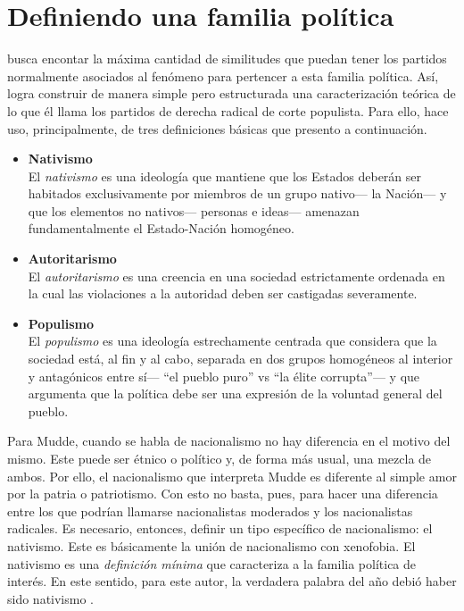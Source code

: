 \section{Definiendo una familia política}

\citeauthor{Mudde07a} busca encontar la máxima cantidad de similitudes que puedan tener los partidos normalmente asociados al fenómeno para pertencer a esta familia política. Así, logra construir de manera simple pero estructurada una caracterización teórica de lo que él llama los partidos de derecha radical de corte populista. Para ello, hace uso, principalmente, de tres definiciones básicas que presento a continuación.

\begin{itemize}
\item \textbf{Nativismo}\\
El \textit{nativismo} es una ideología que mantiene que los Estados deberán ser habitados exclusivamente por miembros de un grupo nativo--- la Nación--- y que los elementos no nativos--- personas e ideas--- amenazan fundamentalmente el Estado-Nación homogéneo.

\item \textbf{Autoritarismo}\\
El \textit{autoritarismo} es una creencia en una sociedad estrictamente ordenada en la cual las violaciones a la autoridad deben ser castigadas severamente.

\item \textbf{Populismo}\\
El \textit{populismo} es una ideología estrechamente centrada que considera que la sociedad está, al fin y al cabo, separada en dos grupos homogéneos al interior y antagónicos entre sí--- ``el pueblo puro'' vs ``la élite corrupta''--- y que argumenta que la política debe ser una expresión de la voluntad general del pueblo.

\end{itemize}

Para Mudde, cuando se habla de nacionalismo no hay diferencia en el motivo del mismo. Este puede ser étnico o político y, de forma más usual, una mezcla de ambos. Por ello, el nacionalismo que interpreta Mudde es diferente al simple amor por la patria o patriotismo. Con esto no basta, pues, para hacer una diferencia entre los que podrían llamarse nacionalistas moderados y los nacionalistas radicales. Es necesario, entonces, definir un tipo específico de nacionalismo: el nativismo. Este es básicamente la unión de nacionalismo con xenofobia. El nativismo es una \textit{definición mínima} que caracteriza a la familia política de interés. En este sentido, para este autor, la verdadera palabra del año debió haber sido nativismo \parencite{MuddeCambridge17}.\\

